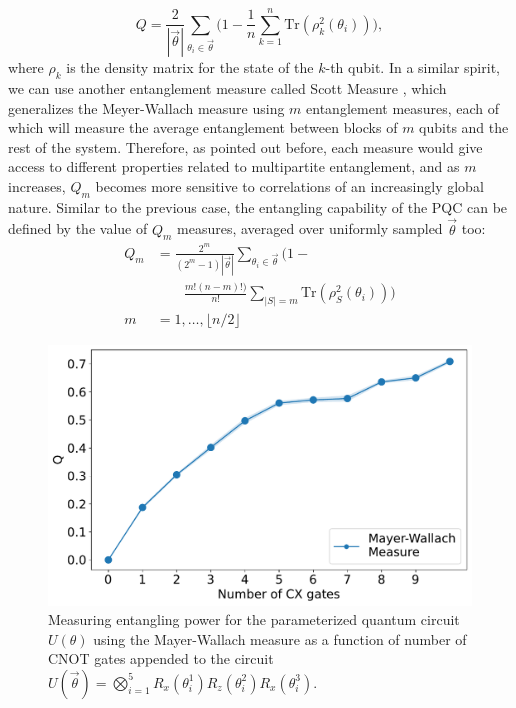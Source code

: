 \begin{equation}
	Q = \frac{2}{|\vec{\theta}|}\sum_{\theta_{i}\in \vec{\theta}}\Bigg(1-\frac{1}{n}\sum_{k=1}^{n}\text{Tr}(\rho_{k}^{2}(\theta_{i}))\Bigg),
\end{equation}
where $\rho_k$ is the density matrix for the state of the $k$-th qubit. In a similar spirit, we can use another entanglement measure called Scott Measure \cite{10.1007/s11128-007-0052-7}, which generalizes the Meyer-Wallach measure using $m$ entanglement measures, each of which will measure the average entanglement between blocks of $m$ qubits and the rest of the system. Therefore, as pointed out before, each measure would give access to different properties related to multipartite entanglement, and as $m$ increases, $Q_m$ becomes more sensitive to correlations of an increasingly global nature. Similar to the previous case, the entangling capability of the PQC can be defined by the value of $Q_m$ measures, averaged over uniformly sampled $\vec{\theta}$ too:
\begin{equation}
    \begin{split}
        Q_{m} &= \frac{2^{m}}{(2^{m}-1) |\vec{\theta}|}\sum_{\theta_i \in \vec{\theta}} \bigg(1 - \\ 
        & \quad \quad \frac{m! (n-m)!)}{n!}\sum_{|S|=m} \text{Tr} (\rho_{S}^2 (\theta_i)) \bigg) \\
        m &= 1, \ldots, \lfloor n/2 \rfloor
    \end{split}
\end{equation}
\begin{figure}[ht]
    \centering
    \includegraphics[width=0.6\linewidth]{figures/qleet/entanglement-capability.pdf}
    \caption[Visualizing entanglement spectrum for parameterized quantum circuits]{Measuring entangling power for the parameterized quantum circuit $U(\theta)$ using the Mayer-Wallach measure as a function of number of CNOT gates appended to the circuit $U(\vec{\theta}) = \bigotimes_{i=1}^{5}R_x(\theta_i^1)R_z(\theta_i^2)R_x(\theta_i^3)$.}
    \label{fig:entanglement-capability}
\end{figure}
